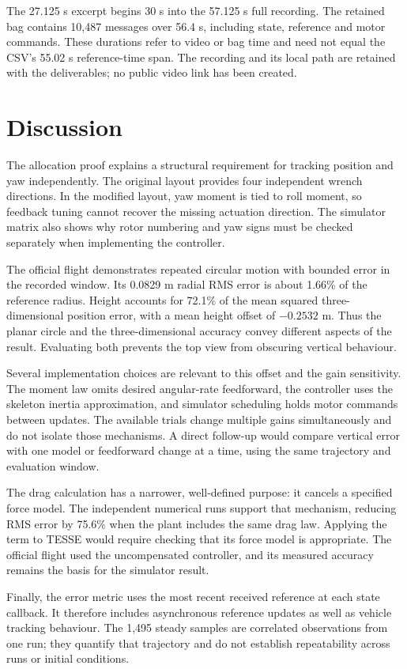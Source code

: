 \documentclass[12pt,a4paper,twoside]{article}
\begin{document}
The 27.125 s excerpt begins 30 s into the 57.125 s full recording. The retained bag contains 10,487 messages over 56.4 s, including state, reference and motor commands. These durations refer to video or bag time and need not equal the CSV's 55.02 s reference-time span. The recording and its local path are retained with the deliverables; no public video link has been created.

\section{Discussion}
The allocation proof explains a structural requirement for tracking position and yaw independently. The original layout provides four independent wrench directions. In the modified layout, yaw moment is tied to roll moment, so feedback tuning cannot recover the missing actuation direction. The simulator matrix also shows why rotor numbering and yaw signs must be checked separately when implementing the controller.

The official flight demonstrates repeated circular motion with bounded error in the recorded window. Its 0.0829 m radial RMS error is about 1.66\% of the reference radius. Height accounts for 72.1\% of the mean squared three-dimensional position error, with a mean height offset of $-0.2532$ m. Thus the planar circle and the three-dimensional accuracy convey different aspects of the result. Evaluating both prevents the top view from obscuring vertical behaviour.

Several implementation choices are relevant to this offset and the gain sensitivity. The moment law omits desired angular-rate feedforward, the controller uses the skeleton inertia approximation, and simulator scheduling holds motor commands between updates. The available trials change multiple gains simultaneously and do not isolate those mechanisms. A direct follow-up would compare vertical error with one model or feedforward change at a time, using the same trajectory and evaluation window.

The drag calculation has a narrower, well-defined purpose: it cancels a specified force model. The independent numerical runs support that mechanism, reducing RMS error by 75.6\% when the plant includes the same drag law. Applying the term to TESSE would require checking that its force model is appropriate. The official flight used the uncompensated controller, and its measured accuracy remains the basis for the simulator result.

Finally, the error metric uses the most recent received reference at each state callback. It therefore includes asynchronous reference updates as well as vehicle tracking behaviour. The 1,495 steady samples are correlated observations from one run; they quantify that trajectory and do not establish repeatability across runs or initial conditions.
\end{document}
